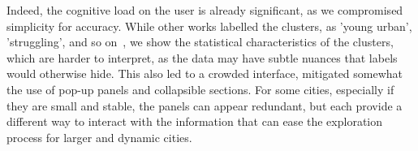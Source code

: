 Indeed, the cognitive load on the user is already significant, as we compromised
simplicity for accuracy. While other works labelled the clusters, as 'young
urban', 'struggling', and so on~\cite{Delmelle2016,Delmelle2017}, we show the
statistical characteristics of the clusters, which are harder to interpret, as
the data may have subtle nuances that labels would otherwise hide. This also led
to a crowded interface, mitigated somewhat the use of pop-up panels and collapsible
sections. For some cities, especially if they are small and stable, the panels
can appear redundant, but each provide a different way to interact with the
information that can ease the exploration process for larger and dynamic cities.
